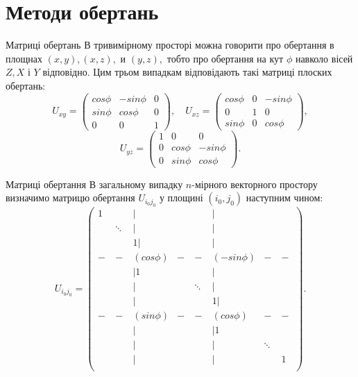 \documentclass[serif,12pt,unicode]{beamer}
\begin{document}
\section{Методи обертань}
\begin{frame}{Матриці обертань}
	В тривимірному просторі можна говорити про обертання в площнах $(x, y), (x, z),$ и $(y, z),$ тобто про обертання на кут $\phi$ навколо вісей $Z, X$ і $Y$ відповідно. Цим трьом випадкам відповідають такі матриці
плоских обертань:
\begin{equation*}
    U_{xy} = \begin{pmatrix}
        cos \phi & -sin \phi & 0\\ sin \phi & cos \phi & 0\\ 0 & 0 & 1
\end{pmatrix}, \quad 
U_{xz} = \begin{pmatrix}
        cos \phi & 0 & -sin \phi\\ 0 & 1 & 0\\sin \phi &0 & cos \phi
\end{pmatrix},
\end{equation*} 
\begin{equation*}
    U_{yz} = \begin{pmatrix}
        1 & 0 & 0\\
        0 & cos \phi & -sin \phi\\
        0 & sin \phi & cos \phi
\end{pmatrix}.
\end{equation*}

\end{frame}
\begin{frame}{Матриці обертання}
В загальному випадку $n$-мірного векторного простору визначимо матрицю обертання $U_{i_0 j_0}$ у площині $(i_0, j_0)$ наступним чином:
\begin{equation}\label{eq:18}
    U_{i_0 j_0} = \begin{pmatrix}
        1 & \quad & |  & \quad & \quad & | & \quad & \quad\\
        \quad & \ddots  & | & \quad & \quad & | & \quad & \quad\\
         \quad & \quad & 1 | &\quad & \quad & | & \quad  & \quad\\
        - & - & (cos \phi) &  - & - & (-sin \phi) &  - & -\\
        \quad & \quad & | 1 &\quad &\quad & | & \quad  & \quad\\
        \quad & \quad & |&\quad & \ddots  & | & \quad & \quad\\
        \quad & \quad & | &\quad & \quad & 1 |  & \quad & \quad\\
        - & - & (sin \phi) & -  & - & (cos \phi) & - & - \\
        \quad & \quad & | & \quad & \quad & | 1 & \quad & \quad\\
        \quad & \quad & | &\quad & \quad & | & \ddots \\
        \quad & \quad & | &\quad  & \quad & | & \quad  & 1\\
\end{pmatrix}.
\end{equation}
\end{frame}
\end{document}
